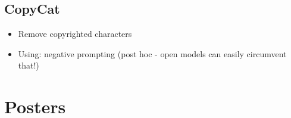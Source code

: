 \documentclass[a4paper]{article}
\begin{document}
\subsection*{CopyCat}
\begin{itemize}
    \item Remove copyrighted characters
    \item Using: negative prompting (post hoc - open models can easily circumvent that!)
\end{itemize}


\section*{Posters}

\end{document}
